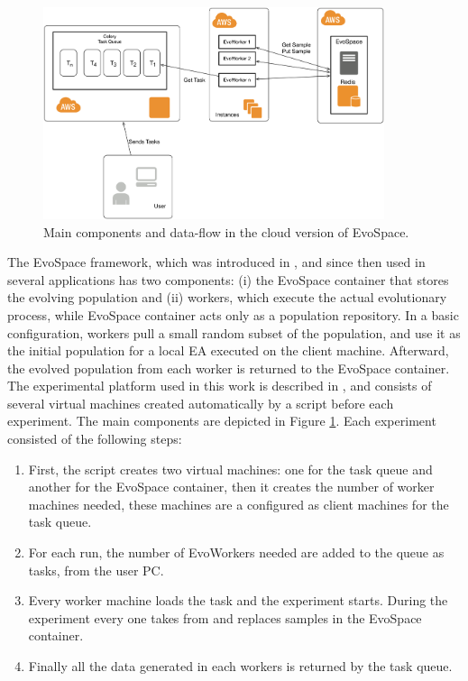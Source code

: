 \documentclass{llncs}
\begin{document}
\begin{figure}[h!tbp]
    \centering
        \includegraphics[width=10cm]{img/EvoSpaceAWS.png}
    \caption{Main components and data-flow in the cloud version of EvoSpace. }
    \label{fig:evospace}
  \end{figure}
The EvoSpace framework, which was introduced in \cite{Evospace}, and
since then used in several applications \cite{GValdez2015} has two components: (i) the EvoSpace 
container that stores the evolving population and (ii) workers, which execute 
the actual evolutionary process, while EvoSpace container acts only as a population repository.
In a basic configuration, workers pull a small random subset of the 
population, and use it as the initial population for a local EA executed 
on the client machine. Afterward, the evolved population from each worker 
is returned to the EvoSpace container. The experimental platform used in this work is
described in \cite{valenzuela2015implementing}, and consists of several virtual machines
created automatically by a script before each experiment. The main components are depicted
in Figure \ref{fig:evospace}. Each experiment consisted of the following steps:

\begin{enumerate}
    \item First, the script creates two virtual machines: one for the task queue and another
    for the EvoSpace container, then it creates the number of worker machines needed, these 
    machines are a configured as client machines for the task queue. 
    \item For each run, the number of EvoWorkers needed are added to the queue as tasks, from
    the user PC.
    \item Every worker machine loads the task and the experiment
      starts. During the experiment every one takes from and replaces
      samples in the EvoSpace container. 
    \item Finally all the data generated in each workers is returned by the task queue. 
    \end{enumerate}
    
\end{document}
